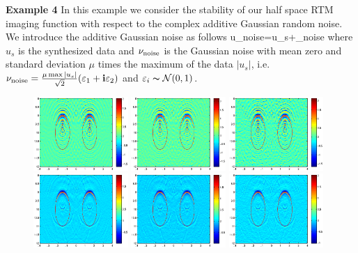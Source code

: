 \documentclass[11pt]{iopart}
\begin{document}
\bigskip
\textbf{Example 4}
In this example we consider the stability of our half space RTM imaging
function with respect to the complex additive Gaussian random noise. We introduce
the additive Gaussian noise as follows
\ben
u_{\rm noise}=u_s+\nu_{\rm noise}
\een
where $u_s$ is the synthesized data and $\nu_{\rm noise}$ is the Gaussian noise with mean zero and standard deviation $\mu$ times the maximum of  the data $|u_s|$, i.e. $\nu_{\rm noise}=\frac{\mu \max |u_s|}{\sqrt{2}}(\varepsilon_1+\mathbf{i}\varepsilon_2)$ and  $\varepsilon_i
\thicksim \mathcal{N}(0,1)$.
\begin{figure}
	\centering
	\includegraphics[width=0.32\textwidth]{./graphic/bi_circle_4pi_error2.eps}
	\includegraphics[width=0.32\textwidth]{./graphic/bi_circle_4pi_error4.eps}
	\includegraphics[width=0.32\textwidth]{./graphic/bi_circle_4pi_error6.eps}
	\includegraphics[width=0.32\textwidth]{./graphic/bi_circle_multi_2_8_error2.eps}
	\includegraphics[width=0.32\textwidth]{./graphic/bi_circle_multi_2_8_error4.eps}
	\includegraphics[width=0.32\textwidth]{./graphic/bi_circle_multi_2_8_error6.eps}
	

\end{figure}
\end{document}
